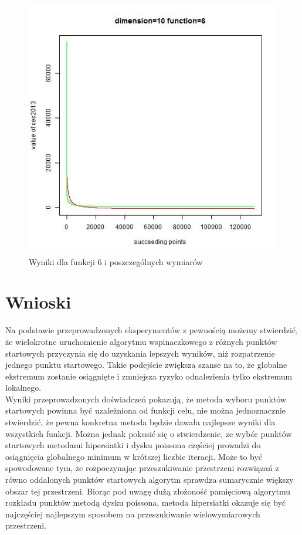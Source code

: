 \documentclass{article}
\begin{document}
\begin{figure}[!htb]
\endminipage\hfill
\includegraphics[scale=0.40]{dim_10__func_6}
\caption{Wyniki dla funkcji 6 i poszczególnych wymiarów}
\end{figure}
\newpage

\section{Wnioski}

Na podstawie przeprowadzonych eksperymentów z pewnością możemy stwierdzić, że wielokrotne uruchomienie algorytmu wspinaczkowego z różnych punktów startowych przyczynia się do uzyskania lepszych wyników, niż rozpatrzenie jednego punktu startowego. Takie podejście zwiększa szanse na to, że globalne ekstremum zostanie osiągnięte i zmniejsza ryzyko odnalezienia tylko ekstremum lokalnego.\\
Wyniki przeprowadzonych doświadczeń pokazują, że metoda wyboru punktów startowych powinna być uzależniona od funkcji celu, nie można jednoznacznie stwierdzić, że pewna konkretna metoda będzie dawała najlepsze wyniki dla wszystkich funkcji. Można jednak pokusić się o stwierdzenie, ze wybór punktów startowych metodami hipersiatki i dysku poissona częściej prowadzi do osiągnięcia globalnego minimum w krótszej liczbie iteracji. Może to być spowodowane tym, że rozpoczynając przeszukiwanie przestrzeni rozwiązań z równo oddalonych punktów startowych algorytm sprawdza sumarycznie większy obszar tej przestrzeni. Biorąc pod uwagę dużą złożoność pamięciową algorytmu rozkładu punktów metodą dysku poissona, metoda hipersiatki okazuje się być najczęściej najlepszym sposobem na przeszukiwanie wielowymiarowych przestrzeni. \\
\end{document}
